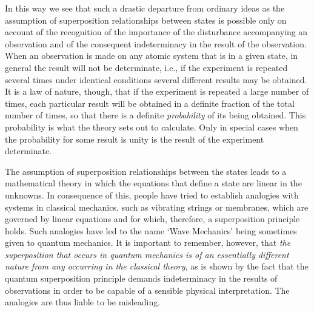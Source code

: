In this way we see that such a drastic departure from ordinary ideas as the assumption of superposition relationships between states is possible only on account of the recognition of the importance of the disturbance accompanying an observation and of the consequent indeterminacy in the result of the observation. When an observation is made on any atomic system that is in a given state, in general the result will not be determinate, i.e., if the experiment is repeated several times under identical conditions several different results may be obtained. It is a law of nature, though, that if the experiment is repeated a large number of times, each particular result will be obtained in a definite fraction of the total number of times, so that there is a definite \emph{probability} of its being obtained.  This probability is what the theory sets out to calculate.  Only in special cases when the probability for some result is unity is the result of the experiment determinate.

The assumption of superposition relationships between the states leads to a mathematical theory in which the equations that define a state are linear in the unknowns.  In consequence of this, people have tried to establish analogies with systems in classical mechanics, such as vibrating strings or membranes, which are governed by linear equations and for which, therefore, a superposition principle holds.  Such analogies have led to the name `Wave Mechanics' being sometimes given to quantum mechanics.  It is important to remember, however, that \emph{the superposition that occurs in quantum mechanics is of an essentially different nature from any occurring in the classical theory}, as is shown by the fact that the quantum superposition principle demands indeterminacy in the results of observations in order to be capable of a sensible physical interpretation.  The analogies are thus liable to be misleading.






  